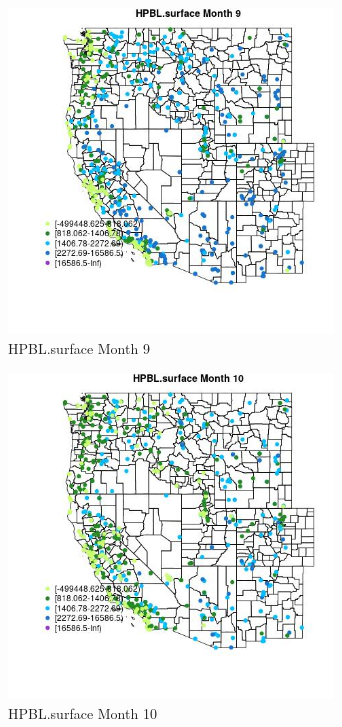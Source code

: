 \begin{figure} 
\centering  
\includegraphics[width=0.77\textwidth]{Code_Outputs/Report_ML_input_PM25_Step4_part_e_de_duplicated_aves_compiled_2019-05-14wNAs_MapObsMo9HPBLsurface.jpg} 
\caption{\label{fig:Report_ML_input_PM25_Step4_part_e_de_duplicated_aves_compiled_2019-05-14wNAsMapObsMo9HPBLsurface}HPBL.surface Month 9} 
\end{figure} 
 

\begin{figure} 
\centering  
\includegraphics[width=0.77\textwidth]{Code_Outputs/Report_ML_input_PM25_Step4_part_e_de_duplicated_aves_compiled_2019-05-14wNAs_MapObsMo10HPBLsurface.jpg} 
\caption{\label{fig:Report_ML_input_PM25_Step4_part_e_de_duplicated_aves_compiled_2019-05-14wNAsMapObsMo10HPBLsurface}HPBL.surface Month 10} 
\end{figure} 
 

